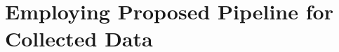 \chapter{Employing Proposed Pipeline for Collected Data}\label{chapter:employing-proposed-pipeline}
